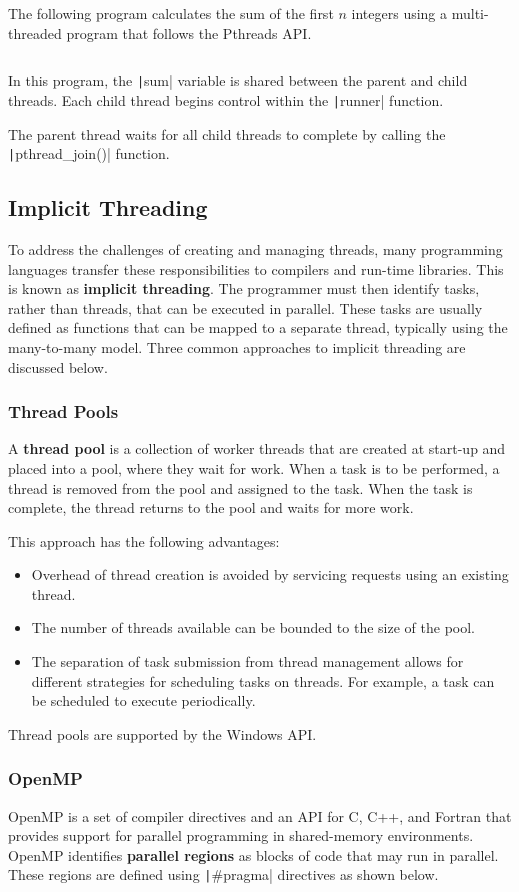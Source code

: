\documentclass{article}
\begin{document}
The following program calculates the sum of the first \(n\) integers
using a multi-threaded program that follows the Pthreads API.\@
\inputminted{c}{code/pthreads_multithreading.c} In this program, the
\texttt|sum| variable is shared between the parent and child
threads. Each child thread begins control within the
\texttt|runner| function.

The parent thread waits for all child threads to complete by calling
the \texttt|pthread_join()| function.
\subsection{Implicit Threading}
To address the challenges of creating and managing threads, many
programming languages transfer these responsibilities to compilers and
run-time libraries. This is known as \textbf{implicit threading}. The
programmer must then identify tasks, rather than threads, that can be
executed in parallel. These tasks are usually defined as functions that
can be mapped to a separate thread, typically using the many-to-many
model. Three common approaches to implicit threading are discussed
below.
\subsubsection{Thread Pools}
A \textbf{thread pool} is a collection of worker threads that are
created at start-up and placed into a pool, where they wait for work.
When a task is to be performed, a thread is removed from the pool and
assigned to the task. When the task is complete, the thread returns to
the pool and waits for more work.

This approach has the following advantages:
\begin{itemize}
    \item Overhead of thread creation is avoided by servicing requests
          using an existing thread.
    \item The number of threads available can be bounded to the size of
          the pool.
    \item The separation of task submission from thread management
          allows for different strategies for scheduling tasks on
          threads. For example, a task can be scheduled to execute
          periodically.
\end{itemize}
Thread pools are supported by the Windows API.\@
\subsubsection{OpenMP}
OpenMP is a set of compiler directives and an API for C, C++, and
Fortran that provides support for parallel programming in shared-memory
environments. OpenMP identifies \textbf{parallel regions} as blocks of
code that may run in parallel. These regions are defined using
\texttt|#pragma| directives as shown below.
\end{document}
